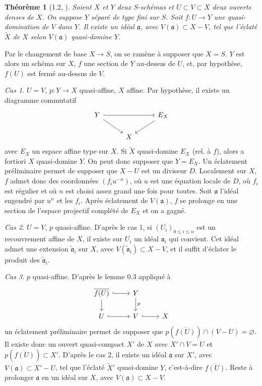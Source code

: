 \documentclass[10pt,a4paper]{article}
\theoremstyle{deligne}
\newtheorem*{theorem*}{Théorème}
\begin{document}
\begin{theorem*}[1.2, {\normalfont [2, théorème 3.2]}]
Soient \(X\) et \(Y\) deux \(S\)-schémas et \(U\subset V\subset X\) deux ouverts denses de \(X\). On suppose \(Y\) séparé de type fini sur \(S\). Soit \(f:U\to Y\) une quasi-domination de \(V\) dans \(Y\). Il existe un idéal \(\mathfrak a\), avec \(V(\mathfrak a)\subset X-V\), tel que l'éclaté \(\widetilde X\) de \(X\) selon \(V(\mathfrak a)\) quasi-domine \(Y\).
\end{theorem*}

Par le changement de base \(X\to S\), on se ramène à supposer que \(X=S\). \(Y\) est alors un schéma sur \(X\), \(f\) une section de \(Y\) au-dessus de \(U\), et, par hypothèse, \(\overline{f(U)}\) est fermé au-dessus de \(V\).

\textit{Cas 1.} \(U=V\), \(p:Y\to X\) quasi-affine, \(X\) affine. Par hypothèse, il existe un diagramme commutatif
\[
\begin{tikzcd}[column sep=2.8em,row sep=1.6em]
Y \arrow[rr] \arrow[dr] && E_X \arrow[dl] \\
& X
\end{tikzcd}
\]
avec \(E_X\) un espace affine type sur \(X\). Si \(\widetilde X\) quasi-domine \(E_X\) (rel. à \(f\)), alors a fortiori \(X\) quasi-domine \(Y\). On peut donc supposer que \(Y=E_X\). Un éclatement préliminaire permet de supposer que \(X-U\) est un diviseur \(D\). Localement sur \(X\), \(f\) admet donc des coordonnées \((f_i u^{-n})\), où \(u\) est une équation locale de \(D\), où \(f_i\) est régulier et où \(n\) est choisi assez grand une fois pour toutes. Soit \(\mathfrak a\) l'idéal engendré par \(u^n\) et les \(f_i\). Après éclatement de \(V(\mathfrak a)\), \(f\) se prolonge en une section de l'espace projectif complété de \(E_X\) et on a gagné.

\textit{Cas 2.} \(U=V\), \(p\) quasi-affine. D'après le cas 1, si \((U_i)_{0\le i\le n}\) est un recouvrement affine de \(X\), il existe sur \(U_i\) un idéal \(\mathfrak a_i\) qui convient. Cet idéal admet une extension \(\widetilde{\mathfrak a}_i\) sur \(X\), avec \(V(\widetilde{\mathfrak a}_i)\subset X-V\), et il suffit d'éclater le produit des \(\widetilde{\mathfrak a}_i\).

\textit{Cas 3.} \(p\) quasi-affine. D'après le lemme 0.3 appliqué à
\[
\begin{tikzcd}[column sep=2.5em,row sep=1.6em]
\overline{f(U)} \arrow[r,hook] \arrow[d] & Y \arrow[d,"p"] \\
U \arrow[r,hook] & V \arrow[r,hook] & X
\end{tikzcd}
\]
un éclatement préliminaire permet de supposer que \(p(\overline{f(U)})\cap (V-U)=\varnothing\). Il existe donc un ouvert quasi-compact \(X'\) de \(X\) avec \(X'\cap V=U\) et \(p(\overline{f(U)})\subset X'\). D'après le cas 2, il existe un idéal \(\mathfrak a\) sur \(X'\), avec \(V(\mathfrak a)\subset X'-U\), tel que l'éclaté \(\widetilde X'\) quasi-domine \(Y\), c'est-à-dire \(\overline{f(U)}\). Reste à prolonger \(\mathfrak a\) en un idéal sur \(X\), avec \(V(\mathfrak a)\subset X-V\).
\end{document}
